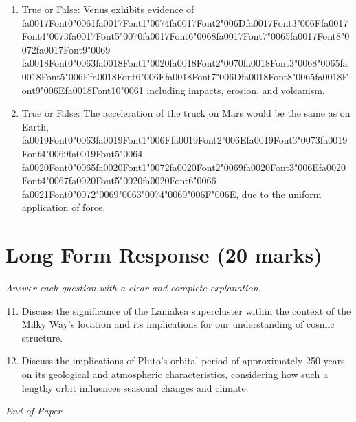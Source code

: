\documentclass[12pt]{article}
\begin{document}
\begin{enumerate}[label=\arabic*.]
\item True or False: Venus exhibits evidence of {\csname fa0017Font0\endcsname\char"0061}{\csname fa0017Font1\endcsname\char"0074}{\csname fa0017Font2\endcsname\char"006D}{\csname fa0017Font3\endcsname\char"006F}{\csname fa0017Font4\endcsname\char"0073}{\csname fa0017Font5\endcsname\char"0070}{\csname fa0017Font6\endcsname\char"0068}{\csname fa0017Font7\endcsname\char"0065}{\csname fa0017Font8\endcsname\char"0072}{\csname fa0017Font9\endcsname\char"0069} {\csname fa0018Font0\endcsname\char"0063}{\csname fa0018Font1\endcsname\char"0020}{\csname fa0018Font2\endcsname\char"0070}{\csname fa0018Font3\endcsname\char"0068}{\char"0065}{\csname fa0018Font5\endcsname\char"006E}{\csname fa0018Font6\endcsname\char"006F}{\csname fa0018Font7\endcsname\char"006D}{\csname fa0018Font8\endcsname\char"0065}{\csname fa0018Font9\endcsname\char"006E}{\csname fa0018Font10\endcsname\char"0061} including impacts, erosion, and volcanism.
\item True or False: The acceleration of the truck on Mars would be the same as on Earth, {\csname fa0019Font0\endcsname\char"0063}{\csname fa0019Font1\endcsname\char"006F}{\csname fa0019Font2\endcsname\char"006E}{\csname fa0019Font3\endcsname\char"0073}{\csname fa0019Font4\endcsname\char"0069}{\csname fa0019Font5\endcsname\char"0064} {\csname fa0020Font0\endcsname\char"0065}{\csname fa0020Font1\endcsname\char"0072}{\csname fa0020Font2\endcsname\char"0069}{\csname fa0020Font3\endcsname\char"006E}{\csname fa0020Font4\endcsname\char"0067}{\csname fa0020Font5\endcsname\char"0020}{\csname fa0020Font6\endcsname\char"0066} {\csname fa0021Font0\endcsname\char"0072}{\char"0069}{\char"0063}{\char"0074}{\char"0069}{\char"006F}{\char"006E}, due to the uniform application of force.
\end{enumerate}

\section*{Long Form Response (20 marks)}
\textit{Answer each question with a clear and complete explanation.}
\begin{enumerate}[label=\arabic*.]
\setcounter{enumi}{10}
\item Discuss the significance of the Laniakea supercluster within the context of the Milky
Way's location and its implications for our understanding of cosmic structure.
\item Discuss the implications of Pluto's orbital period of approximately 250 years on its
geological and atmospheric characteristics, considering how such a lengthy orbit
influences seasonal changes and climate.
\end{enumerate}

\vfill
\noindent\textit{End of Paper}
\end{document}
